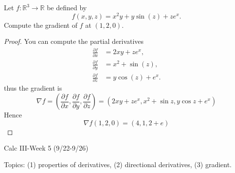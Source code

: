 \documentclass[openany]{book}
\begin{document}







\begin{prob}
    Let \( f : \mathbb{R}^3 \to \mathbb{R} \) be defined by  
\[
f(x, y, z) = x^2 y + y \sin(z) + z e^x.
\]  
Compute the gradient of $f$ at $(1,2,0)$.
\end{prob}
\begin{proof}
    You can compute the partial derivatives 
    \begin{align*}
        \frac{\partial f}{\partial x} &= 2xy + ze^x, \\
        \frac{\partial f}{\partial y} &= x^2 + \sin(z), \\
        \frac{\partial f}{\partial z} &= y \cos(z) + e^x.
        \end{align*}
    thus the gradient is 
    \[
\nabla f = \left( \frac{\partial f}{\partial x}, \frac{\partial f}{\partial y}, \frac{\partial f}{\partial z} \right)=(2xy+ze^x, x^2+\sin z, y\cos z+e^x)
\]
Hence 
\begin{equation*}
    \nabla f(1,2,0)=(4, 1, 2+e)
\end{equation*}

\end{proof}


\newpage

\begin{center}
    \Large Calc III-Week 5 (9/22-9/26)
\end{center}

\renewcommand\thesection{\arabic{section}}

\noindent
Topics: (1) properties of derivatives, (2) directional derivatives, (3) gradient.



 
\end{document}
